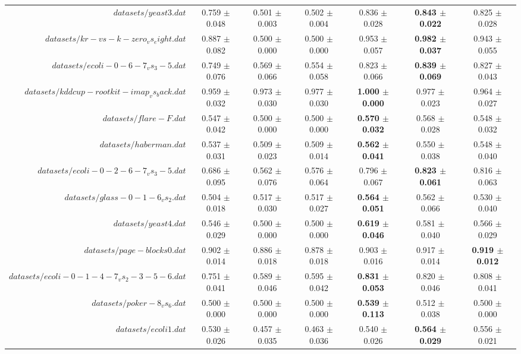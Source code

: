 \begin{table}[!ht]
{\begin{tabular}{r c c c c c c}
$datasets/yeast3.dat$ & 0.759 $\pm$ 0.048 & 0.501 $\pm$ 0.003 & 0.502 $\pm$ 0.004 & 0.836 $\pm$ 0.028 & \textbf{0.843 $\pm$ 0.022} & 0.825 $\pm$ 0.028 \\
$datasets/kr-vs-k-zero_vs_eight.dat$ & 0.887 $\pm$ 0.082 & 0.500 $\pm$ 0.000 & 0.500 $\pm$ 0.000 & 0.953 $\pm$ 0.057 & \textbf{0.982 $\pm$ 0.037} & 0.943 $\pm$ 0.055 \\
$datasets/ecoli-0-6-7_vs_3-5.dat$ & 0.749 $\pm$ 0.076 & 0.569 $\pm$ 0.066 & 0.554 $\pm$ 0.058 & 0.823 $\pm$ 0.066 & \textbf{0.839 $\pm$ 0.069} & 0.827 $\pm$ 0.043 \\
$datasets/kddcup-rootkit-imap_vs_back.dat$ & 0.959 $\pm$ 0.032 & 0.973 $\pm$ 0.030 & 0.977 $\pm$ 0.030 & \textbf{1.000 $\pm$ 0.000} & 0.977 $\pm$ 0.023 & 0.964 $\pm$ 0.027 \\
$datasets/flare-F.dat$ & 0.547 $\pm$ 0.042 & 0.500 $\pm$ 0.000 & 0.500 $\pm$ 0.000 & \textbf{0.570 $\pm$ 0.032} & 0.568 $\pm$ 0.028 & 0.548 $\pm$ 0.032 \\
$datasets/haberman.dat$ & 0.537 $\pm$ 0.031 & 0.509 $\pm$ 0.023 & 0.509 $\pm$ 0.014 & \textbf{0.562 $\pm$ 0.041} & 0.550 $\pm$ 0.038 & 0.548 $\pm$ 0.040 \\
$datasets/ecoli-0-2-6-7_vs_3-5.dat$ & 0.686 $\pm$ 0.095 & 0.562 $\pm$ 0.076 & 0.576 $\pm$ 0.064 & 0.796 $\pm$ 0.067 & \textbf{0.823 $\pm$ 0.061} & 0.816 $\pm$ 0.063 \\
$datasets/glass-0-1-6_vs_2.dat$ & 0.504 $\pm$ 0.018 & 0.517 $\pm$ 0.030 & 0.517 $\pm$ 0.027 & \textbf{0.564 $\pm$ 0.051} & 0.562 $\pm$ 0.066 & 0.530 $\pm$ 0.040 \\
$datasets/yeast4.dat$ & 0.546 $\pm$ 0.029 & 0.500 $\pm$ 0.000 & 0.500 $\pm$ 0.000 & \textbf{0.619 $\pm$ 0.046} & 0.581 $\pm$ 0.040 & 0.566 $\pm$ 0.029 \\
$datasets/page-blocks0.dat$ & 0.902 $\pm$ 0.014 & 0.886 $\pm$ 0.018 & 0.878 $\pm$ 0.018 & 0.903 $\pm$ 0.016 & 0.917 $\pm$ 0.014 & \textbf{0.919 $\pm$ 0.012} \\
$datasets/ecoli-0-1-4-7_vs_2-3-5-6.dat$ & 0.751 $\pm$ 0.041 & 0.589 $\pm$ 0.046 & 0.595 $\pm$ 0.042 & \textbf{0.831 $\pm$ 0.053} & 0.820 $\pm$ 0.046 & 0.808 $\pm$ 0.041 \\
$datasets/poker-8_vs_6.dat$ & 0.500 $\pm$ 0.000 & 0.500 $\pm$ 0.000 & 0.500 $\pm$ 0.000 & \textbf{0.539 $\pm$ 0.113} & 0.512 $\pm$ 0.038 & 0.500 $\pm$ 0.000 \\
$datasets/ecoli1.dat$ & 0.530 $\pm$ 0.026 & 0.457 $\pm$ 0.035 & 0.463 $\pm$ 0.036 & 0.540 $\pm$ 0.026 & \textbf{0.564 $\pm$ 0.029} & 0.556 $\pm$ 0.021 \\

\end{tabular}}
\end{table}
